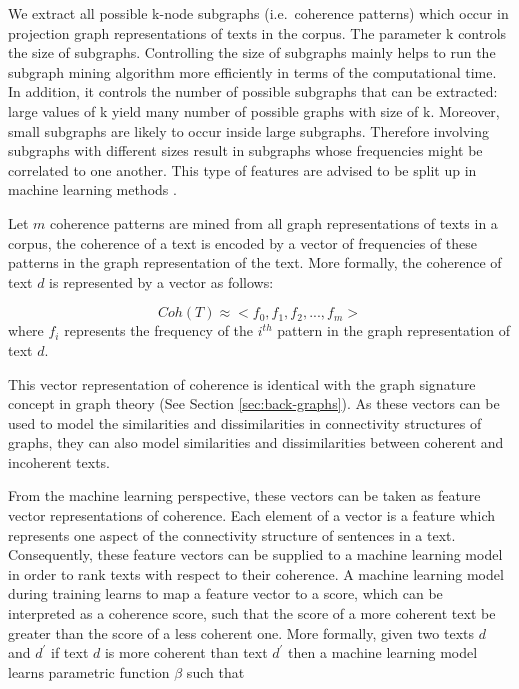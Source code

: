 We extract all possible k-node subgraphs (i.e.\ coherence patterns) which occur in projection graph representations of texts in the corpus. 
The parameter k controls the size of subgraphs.  
Controlling the size of subgraphs mainly helps to run the subgraph mining algorithm more efficiently in terms of the computational time.
In addition, it controls the number of possible subgraphs that can be extracted: large values of k yield many number of possible graphs with size of k. 
Moreover, small subgraphs are likely to occur inside large subgraphs. 
Therefore involving subgraphs with different sizes result in subgraphs whose frequencies might be correlated to one another.  
This type of features are advised to be split up in machine learning methods \cite{}. 

Let $m$ coherence patterns are mined from all graph representations of texts in a corpus, the coherence of a text is encoded by a vector of frequencies of these patterns in the graph representation of the text. 
More formally, the coherence of  text $d$ is represented by a vector as follows:

\begin{equation}
Coh(T) \approx <f_0,f_1,f_2,...,f_m>
\end{equation}
where $f_i$ represents the frequency of the $i^{th}$ pattern in the graph representation of text $d$. 

This vector representation of coherence is identical with the graph signature concept in graph theory (See Section \ref{sec:back-graphs}). 
As these vectors can be used to model the similarities and dissimilarities in connectivity structures of graphs, they can also model similarities and dissimilarities between coherent and incoherent texts. 

From the machine learning perspective, these vectors can be taken as feature vector representations of coherence. 
Each element of a vector is a feature which represents one aspect of the connectivity structure of sentences in a text. 
Consequently, these feature vectors can be supplied to a machine learning model in order to rank texts with respect to their coherence. 
A machine learning model during training learns to map a feature vector to a score, which can be interpreted as a coherence score, such that the score of a more coherent text be greater than the score of a less coherent one. 
More formally, given two texts $d$ and $d^\prime$ if text $d$ is more coherent than text $d^\prime$ then a machine learning model learns parametric function $\beta$ such that 

